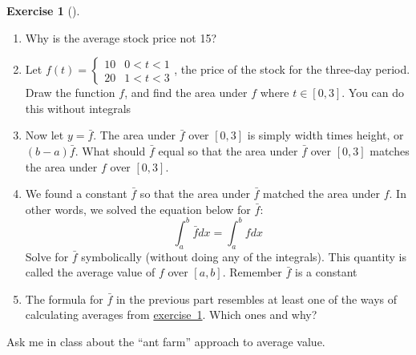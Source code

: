 \documentclass[10pt,]{book}
\theoremstyle{plain}
\theoremstyle{definition}
\theoremstyle{definition}
\theoremstyle{definition}
\theoremstyle{definition}
\newtheorem{exploration}[project]{Exercise}
\theoremstyle{definition}
\numberwithin{equation}{section}
\newcommand{\lt}{<}
\newcommand{\amp}{&}
\begin{document}
\begin{exploration}[]\label{exploration-212}
\leavevmode%
\begin{enumerate}[font=\bfseries,label=(\alph*),ref=\alph*]
\item\label{task-543} Why is the average stock price not \textdollar{}15?%
\item\label{task-544} Let \(f(t) = \begin{cases}10 \amp 0\lt t\lt 1\\20\amp 1\lt t\lt 3
\end{cases}\), the price of the stock for the three-day period. Draw the function \(f\), and find the area under \(f\) where \(t\in[0,3]\). You can do this without integrals%
%
\item\label{task-545} Now let \(y=\bar f\).  The area under \(\bar f\) over \([0,3]\) is simply width times height, or \((b-a)\bar f\). What should \(\bar f\) equal so that the area under \(\bar f\) over \([0,3]\) matches the area under \(f\) over \([0,3]\).%
\item\label{task-546} We found a constant \(\bar f\) so that the area under \(\bar f\) matched the area under \(f\). In other words, we solved the equation below for \(\bar f\):%
\begin{equation*}
\int_a^b \bar f dx = \int_a^b f dx
\end{equation*}
Solve for \(\bar f\) symbolically (without doing any of the integrals). This quantity is called the average value of \(f\) over \([a,b]\). Remember \(\bar{f}\) is a constant%
%
\item\label{task-547} The formula for \(\bar f\) in the previous part resembles at least one of the ways of calculating averages from \hyperref[average_value_methods]{exercise~1}.  Which ones and why?%
\end{enumerate}
\end{exploration}
Ask me in class about the ``ant farm'' approach to average value.%
\end{document}
